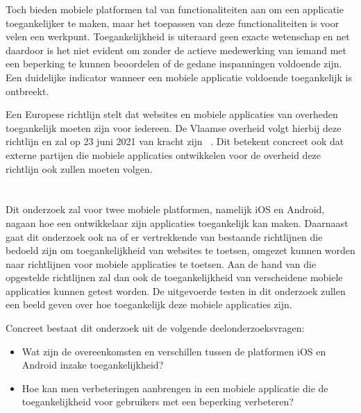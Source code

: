 Toch bieden mobiele platformen tal van functionaliteiten aan om een applicatie toegankelijker te maken, maar het toepassen van deze functionaliteiten is voor velen een werkpunt. Toegankelijkheid is uiteraard geen exacte wetenschap en net daardoor is het niet evident om zonder de actieve medewerking van iemand met een beperking te kunnen beoordelen of de gedane inspanningen voldoende zijn. Een duidelijke indicator wanneer een mobiele applicatie voldoende toegankelijk is ontbreekt.

Een Europese richtlijn stelt dat websites en mobiele applicaties van overheden toegankelijk moeten zijn voor iedereen. 
De Vlaamse overheid volgt hierbij deze richtlijn en zal op 23 juni 2021 van kracht zijn ~\autocite{vlaanderenVerplichting}. Dit betekent concreet ook dat externe partijen die mobiele applicaties ontwikkelen voor de overheid deze richtlijn ook zullen moeten volgen.


\section{}
\label{sec:onderzoeksvraag}



Dit onderzoek zal voor twee mobiele platformen, namelijk iOS en Android, nagaan hoe een ontwikkelaar zijn applicaties toegankelijk kan maken. Daarnaast gaat dit onderzoek ook na of er vertrekkende van bestaande richtlijnen die bedoeld zijn om toegankelijkheid van websites te toetsen, omgezet kunnen worden naar richtlijnen voor mobiele applicaties te toetsen. Aan de hand van die opgestelde richtlijnen zal dan ook de toegankelijkheid van verscheidene mobiele applicaties kunnen getest worden. De uitgevoerde testen in dit onderzoek zullen een beeld geven over hoe  toegankelijk deze mobiele applicaties zijn.

Concreet bestaat dit onderzoek uit de volgende deelonderzoeksvragen:
\begin{itemize}
    \item Wat zijn de overeenkomsten en verschillen tussen de platformen iOS en Android inzake toegankelijkheid?
    \item Hoe kan men verbeteringen aanbrengen in een mobiele applicatie die de toegankelijkheid voor gebruikers met een beperking verbeteren?
\end{itemize}

